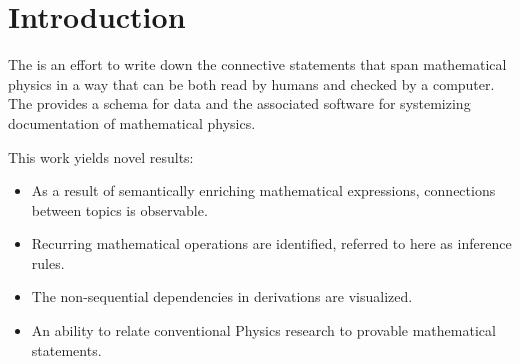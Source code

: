 \section{Introduction\label{sec:intro}}

The \pdg{} is an effort to write down the connective statements that span mathematical physics in a way that can be both read by humans and checked by a computer.
The \pdg{} provides a  schema for data and the associated software for systemizing  documentation of mathematical physics. 

This work yields novel results:
\begin{itemize}
    \item As a result of semantically enriching mathematical expressions, connections between topics is observable.
    \item Recurring mathematical operations are identified, referred to here as \glspl{inference rule}.
    \item The non-sequential dependencies in derivations are visualized.
    \item An ability to relate conventional Physics research to provable mathematical statements.
\end{itemize}
